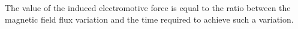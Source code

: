 The value of the induced electromotive force is equal to the ratio between the 
magnetic field flux variation and the
time required to achieve such a variation. %